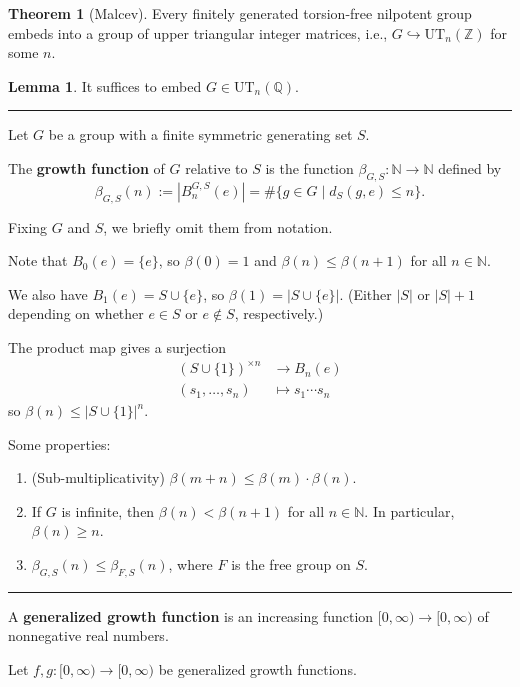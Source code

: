 \documentclass[12pt]{article}
\newcommand{\keyword}[1]{\textbf{#1}}
\newcommand{\sepline}{\rule{\textwidth}{0.4pt}}
\theoremstyle{definition}
\newtheorem{theorem}{Theorem}
\newtheorem{lemma}{Lemma}
\newcommand{\N}{\mathbb{N}}
\newcommand{\Z}{\mathbb{Z}}
\newcommand{\Q}{\mathbb{Q}}
\newcommand{\<}{\left\langle}
\renewcommand{\>}{\right\rangle}
\newcommand{\inc}{\hookrightarrow}
\begin{document}
\begin{theorem}[Malcev]
    Every finitely generated torsion-free nilpotent group embeds into a group of upper triangular integer matrices, i.e., $G \inc \mathrm{UT}_n(\Z)$ for some $n$.
\end{theorem}

\begin{lemma}
    It suffices to embed $G \in \mathrm{UT}_n(\Q)$.
\end{lemma}

\sepline

Let $G$ be a group with a finite symmetric generating set $S$.

The \keyword{growth function} of $G$ relative to $S$ is the function $\beta_{G,S} : \N \to \N$ defined by
\[
    \beta_{G, S}(n)
        := |B_n^{G,S}(e)|
        = \#\{g \in G \mid d_S(g, e) \leq n\}.
\]

Fixing $G$ and $S$, we briefly omit them from notation.

Note that $B_0(e) = \{e\}$, so $\beta(0) = 1$ and $\beta(n) \leq \beta(n + 1)$ for all $n \in \N$.

We also have $B_1(e) = S \cup \{e\}$, so $\beta(1) = |S \cup \{e\}|$.
(Either $|S|$ or $|S| + 1$ depending on whether $e \in S$ or $e \notin S$, respectively.)

The product map gives a surjection
\begin{align*}
    (S \cup \{1\})^{\times n} &\longrightarrow B_n(e) \\
    (s_1, \dots, s_n) &\longmapsto s_1 \cdots s_n
\end{align*}
so $\beta(n) \leq |S \cup \{1\}|^n$.


Some properties:
\begin{enumerate}[(1)]
    \item (Sub-multiplicativity) $\beta(m + n) \leq \beta(m) \cdot \beta(n)$.
    \item If $G$ is infinite, then $\beta(n) < \beta(n + 1)$ for all $n \in \N$.
    In particular, $\beta(n) \geq n$.
    \item $\beta_{G,S}(n) \leq \beta_{F, S}(n)$, where $F$ is the free group on $S$.
\end{enumerate}

\sepline

A \keyword{generalized growth function} is an increasing function $[0, \infty) \to [0, \infty)$ of nonnegative real numbers.

Let $f, g : [0, \infty) \to [0, \infty)$ be generalized growth functions.
\end{document}
